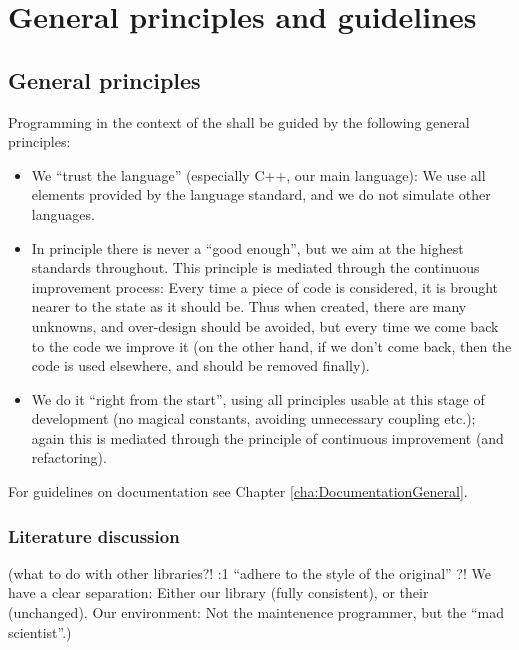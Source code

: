 \documentclass{book}
\begin{document}
\part{General principles and guidelines}
\label{par:General}


\chapter{General principles}
\label{cha:GenPrinciples}

Programming in the context of the \OKlibrary{} shall be guided by the following general principles:
\begin{itemize}
\item We ``trust the language'' (especially C++, our main language): We use all elements provided by the language standard, and we do not simulate other languages.
\item In principle there is never a ``good enough'', but we aim at the highest standards throughout. This principle is mediated through the continuous improvement process: Every time a piece of code is considered, it is brought nearer to the state as it should be. Thus when created, there are many unknowns, and over-design should be avoided, but every time we come back to the code we improve it (on the other hand, if we don't come back, then the code is used elsewhere, and should be removed finally).
\item We do it ``right from the start'', using all principles usable at this stage of development (no magical constants, avoiding unnecessary coupling etc.); again this is mediated through the principle of continuous improvement (and refactoring).
\end{itemize}

For guidelines on documentation see Chapter \ref{cha:DocumentationGeneral}.





\section{Literature discussion}
\label{sec:generalprinciplesliterature}

(what to do with other libraries?! \cite{OKL_MisfeldtBumgardnerGray2004CppStyle}:1 ``adhere to the style of the original'' ?! We have a clear separation: Either our library (fully consistent), or their (unchanged). Our environment: Not the maintenence programmer, but the ``mad scientist''.)
\end{document}
